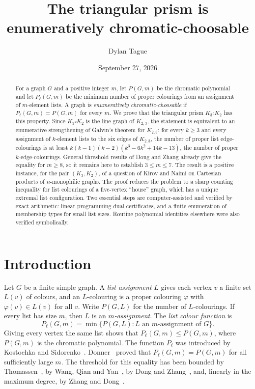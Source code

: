 \documentclass[11pt]{amsart}
\title{The triangular prism is enumeratively chromatic-choosable}
\author{Dylan Tague}
\date{September 27, 2026}
\theoremstyle{definition}
\theoremstyle{remark}
\newcommand{\Pl}{P_\ell}
\newcommand{\1}{\mathbf 1}
\begin{document}
\begin{abstract}
For a graph $G$ and a positive integer $m$, let $P(G,m)$ be the chromatic polynomial and let
$\Pl(G,m)$ be the minimum number of proper colourings from an assignment of $m$-element lists.
A graph is \emph{enumeratively chromatic-choosable} if $\Pl(G,m)=P(G,m)$ for every $m$.
We prove that the triangular prism $K_3\square K_2$ has this property. Since
$K_3\square K_2$ is the line graph of $K_{2,3}$, the statement is equivalent to an
enumerative strengthening of Galvin's theorem for $K_{2,3}$: for every $k\ge 3$ and every
assignment of $k$-element lists to the six edges of $K_{2,3}$, the number of proper list
edge-colourings is at least $k(k-1)(k-2)(k^3-6k^2+14k-13)$, the number of proper
$k$-edge-colourings. General threshold results of Dong and Zhang already give the equality for
$m\ge 8$, so it remains here to establish $3\le m\le 7$. The result is a positive instance, for the
pair $(K_3,K_2)$, of a question of Kirov and Naimi on Cartesian products of $n$-monophilic graphs.
The proof reduces the problem to a sharp counting inequality for list colourings of a five-vertex
``house'' graph, which has a unique extremal list configuration. Two essential steps are computer-assisted
and verified by exact arithmetic: linear-programming dual certificates, and a finite enumeration of
membership types for small list sizes. Routine polynomial identities elsewhere were also verified
symbolically.
\end{abstract}

\maketitle

\section{Introduction}\label{sec:intro}

Let $G$ be a finite simple graph. A \emph{list assignment} $L$ gives each vertex $v$ a finite set
$L(v)$ of colours, and an $L$-colouring is a proper colouring $\varphi$ with $\varphi(v)\in L(v)$
for all $v$. Write $P(G,L)$ for the number of $L$-colourings. If every list has size $m$, then $L$
is an \emph{$m$-assignment}. The \emph{list colour function} is
\[
\Pl(G,m)=\min\{P(G,L): L \text{ an $m$-assignment of } G\}.
\]
Giving every vertex the same list shows that $\Pl(G,m)\le P(G,m)$, where $P(G,m)$ is the chromatic
polynomial. The function $\Pl$ was introduced by Kostochka and Sidorenko~\cite{KS}. Donner~\cite{Donner}
proved that $\Pl(G,m)=P(G,m)$ for all sufficiently large $m$. The threshold for this equality has been
bounded by Thomassen~\cite{Thomassen}, by Wang, Qian and Yan~\cite{WQY}, by Dong and
Zhang~\cite{DZ23}, and, linearly in the maximum degree, by Zhang and Dong~\cite{ZD26}.
\end{document}
